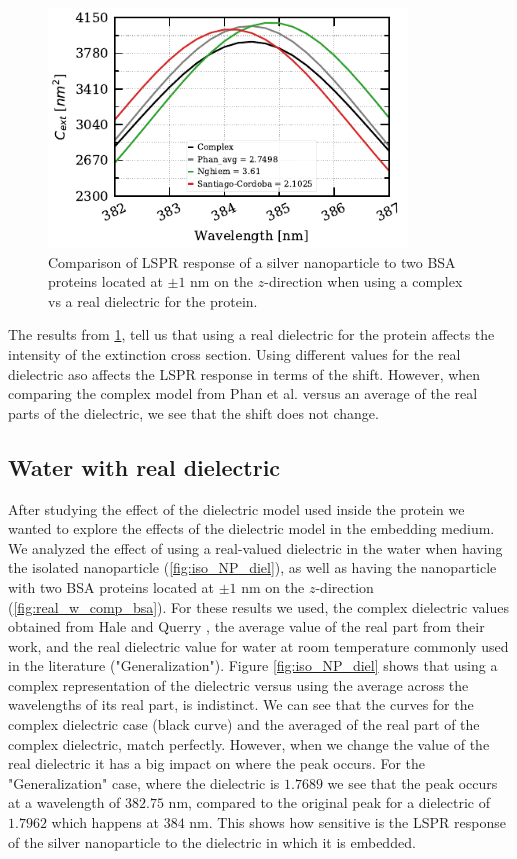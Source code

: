 \begin{figure} %
    \centering
    \includegraphics[width=0.85\textwidth]{bsa_diel_study.pdf} 
    \caption{Comparison of LSPR response of a silver nanoparticle to two BSA proteins located at $\pm1$ nm on the $z$-direction
    when using a complex vs a real dielectric for the protein.}
    \label{fig:bsa_diel}
 \end{figure}

The results from \ref{fig:bsa_diel}, tell us that using a real dielectric for the protein affects the intensity of the extinction cross section. Using 
different values for the real dielectric aso affects the LSPR response in terms of the shift. However, when comparing the complex model from Phan et al. versus
an average of the real parts of the dielectric, we see that the shift does not change. 

\subsection{Water with real dielectric}

After studying the effect of the dielectric model used inside the protein we wanted to explore the effects of the dielectric model in the 
embedding medium. We analyzed the effect of using a real-valued dielectric in the water when having the isolated nanoparticle (\ref{fig:iso_NP_diel}), 
as well as having the nanoparticle with two BSA proteins located at $\pm1$ nm on the $z$-direction (\ref{fig:real_w_comp_bsa}). For these results we used, 
the complex dielectric values obtained from Hale and Querry \cite{HaleQuerry1972}, the average value of the real part from their work, and the real 
dielectric value for water at room temperature commonly used in the literature ("Generalization"). Figure \ref{fig:iso_NP_diel} shows
that using a complex representation of the dielectric versus using the average across the wavelengths of its real part, is indistinct. We can see that the curves
for the complex dielectric case (black curve) and the averaged of the real part of the complex dielectric, match perfectly. However, when we change the value of 
the real dielectric it has a big impact on where the peak occurs. For the "Generalization" case, where the dielectric is $1.7689$ we see that the peak occurs at 
a wavelength of $382.75$ nm, compared to the original peak for a dielectric of $1.7962$ which happens at $384$ nm. This shows how sensitive is the LSPR response 
of the silver nanoparticle to the dielectric in which it is embedded. 
 
